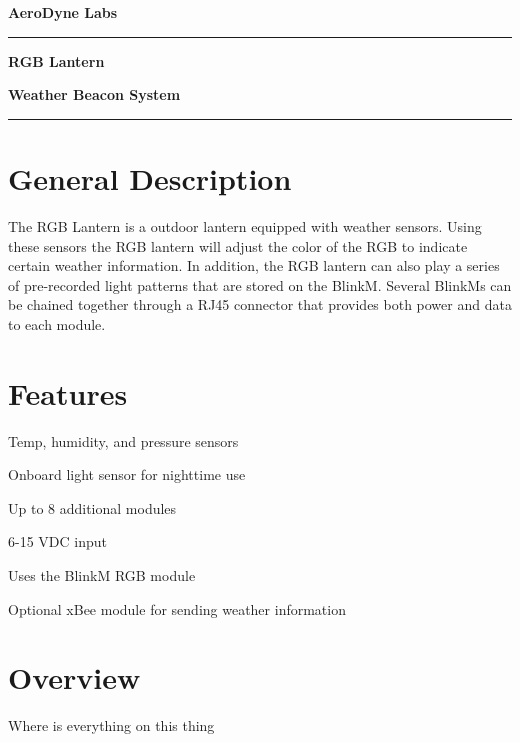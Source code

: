 \documentclass[letterpaper,twoside]{article}
\begin{document}
\thispagestyle{plain} %
\textsf{\textbf{\Large{AeroDyne Labs}}}\\
\rule{\linewidth}{2pt}
\vspace{8pt}
\par\textsf{\textbf{\Huge{RGB Lantern}}}
\vspace{16pt}
\par\textsf{\textbf{\Large{Weather Beacon System}}}
\vspace{8pt}\\
\rule{\linewidth}{1pt}
\vspace{8pt}

\begin{multicols}{2}

\section*{General Description}
The RGB Lantern is a outdoor lantern equipped with weather sensors.  Using these sensors the RGB lantern will adjust the color of the RGB to indicate certain weather information.  In addition, the RGB lantern can also play a series of pre-recorded light patterns that are stored on the BlinkM.  Several BlinkMs can be chained together through a RJ45 connector that provides both power and data to each module.  

\vfill
\columnbreak

\section*{Features}
\begin{itemize*}
	\item Temp, humidity, and pressure sensors
	\item Onboard light sensor for nighttime use 
	\item Up to 8 additional modules
	\item 6-15 VDC input
	\item Uses the BlinkM RGB module
	\item Optional xBee module for sending weather information

\end{itemize*}

\end{multicols}

\newpage

\tableofcontents

\section{Overview}
Where is everything on this thing
\end{document}
